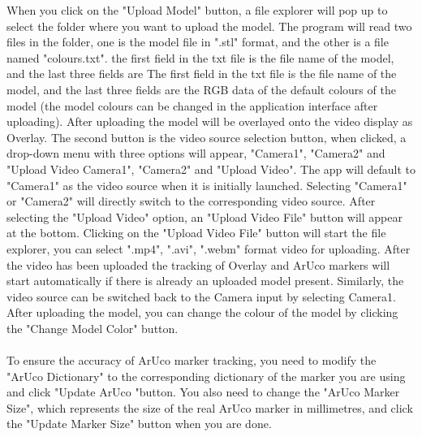 \documentclass[12pt]{article}
\begin{document}
\begin{enumerate}
\begin{enumerate}
                        When you click on the "Upload Model" button, a file explorer will pop up to select the folder where you want to upload the model. The program will read two files in the folder, one is the model file in ".stl" format, and the other is a file named "colours.txt". the first field in the txt file is the file name of the model, and the last three fields are The first field in the txt file is the file name of the model, and the last three fields are the RGB data of the default colours of the model (the model colours can be changed in the application interface after uploading). After uploading the model will be overlayed onto the video display as Overlay. The second button is the video source selection button, when clicked, a drop-down menu with three options will appear, "Camera1", "Camera2" and "Upload Video Camera1", "Camera2" and "Upload Video". The app will default to "Camera1" as the video source when it is initially launched. Selecting "Camera1" or "Camera2" will directly switch to the corresponding video source. After selecting the "Upload Video" option, an "Upload Video File" button will appear at the bottom. Clicking on the "Upload Video File" button will start the file explorer, you can select ".mp4", ".avi", ".webm" format video for uploading. After the video has been uploaded the tracking of Overlay and ArUco markers will start automatically if there is already an uploaded model present. Similarly, the video source can be switched back to the Camera input by selecting Camera1. After uploading the model, you can change the colour of the model by clicking the "Change Model Color" button.
                        \\\\
                        To ensure the accuracy of ArUco marker tracking, you need to modify the "ArUco Dictionary" to the corresponding dictionary of the marker you are using and click "Update ArUco "button. You also need to change the "ArUco Marker Size", which represents the size of the real ArUco marker in millimetres, and click the "Update Marker Size" button when you are done.


\end{enumerate}
\end{enumerate}
\end{document}
